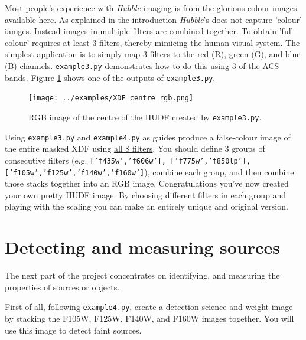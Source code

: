 \documentclass{article}
\begin{document}
Most people's experience with {\em Hubble} imaging is from the glorious colour images available \href{https://hubblesite.org}{here}. As explained in the introduction {\em Hubble}'s does not capture 'colour' iamges. Instead images in multiple filters are combined together. To obtain 'full-colour' requires at least 3 filters, thereby mimicing the human visual system. The simplest application is to simply map 3 filters to the red (R), green (G), and blue (B) channels. \texttt{example3.py} demonstrates how to do this using 3 of the ACS bands. Figure \ref{fig:centre_rgb} shows one of the outputs of \texttt{example3.py}.


\begin{figure}\label{fig:centre_rgb}
	\centering
	\texttt{[image: ../examples/XDF\_centre\_rgb.png]}
	\caption{RGB image of the centre of the HUDF created by \texttt{example3.py}.}
\end{figure}

\begin{question}
Using  \texttt{example3.py} and \texttt{example4.py} as guides produce a false-colour image of the entire masked XDF using \underline{all 8 filters}. You should define 3 groups of consecutive filters (e.g. \texttt{['f435w','f606w'], ['f775w','f850lp'], ['f105w','f125w','f140w','f160w']}), combine each group, and then combine those stacks together into an RGB image. Congratulations you've now created your own pretty HUDF image. By choosing different filters in each group and playing with the scaling you can make an entirely unique and original version.
\end{question}









\setcounter{Question}{0}
\section{Detecting and measuring sources}

The next part of the project concentrates on identifying, and measuring the properties of sources or objects.

\begin{question}
First of all, following \texttt{example4.py}, create a detection science and weight image by stacking the F105W, F125W, F140W, and F160W images together. You will use this image to detect faint sources.
\end{question}
\end{document}
